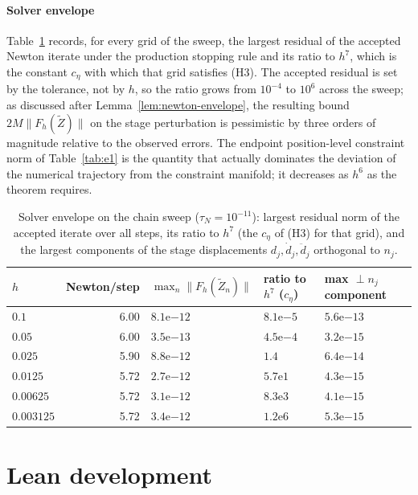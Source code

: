 \paragraph{Solver envelope}
Table~\ref{tab:e7} records, for every grid of the sweep, the largest residual of the accepted Newton
iterate under the production stopping rule and its ratio to $h^7$, which is the constant $c_\eta$
with which that grid satisfies (H3). The accepted residual is set by the tolerance, not by $h$, so
the ratio grows from $10^{-4}$ to $10^{6}$ across the sweep; as discussed after
Lemma~\ref{lem:newton-envelope}, the resulting bound $2M\|F_h(\widetilde Z)\|$ on the stage
perturbation is pessimistic by three orders of magnitude relative to the observed errors. The
endpoint position-level constraint norm of Table~\ref{tab:e1} is the quantity that actually
dominates the deviation of the numerical trajectory from the constraint manifold; it decreases as
$h^6$ as the theorem requires.

\begin{table}[!htb]
\centering
\caption{Solver envelope on the chain sweep ($\tau_N=10^{-11}$): largest residual norm of the
accepted iterate over all steps, its ratio to $h^7$ (the $c_\eta$ of (H3) for that grid), and the
largest components of the stage displacements $d_j,\dot d_j,\ddot d_j$ orthogonal to $n_j$.}
\label{tab:e7}
\footnotesize
\begin{tabular}{@{}lrlll@{}}
\toprule
$h$ & Newton/step & $\max_n\|F_h(\widetilde Z_n)\|$ & ratio to $h^7$ ($c_\eta$) & max $\perp n_j$ component \\
\midrule
$0.1$      & 6.00 & $8.1\mathrm{e}{-12}$ & $8.1\mathrm{e}{-5}$ & $5.6\mathrm{e}{-13}$ \\
$0.05$     & 6.00 & $3.5\mathrm{e}{-13}$ & $4.5\mathrm{e}{-4}$ & $3.2\mathrm{e}{-15}$ \\
$0.025$    & 5.90 & $8.8\mathrm{e}{-12}$ & $1.4$               & $6.4\mathrm{e}{-14}$ \\
$0.0125$   & 5.72 & $2.7\mathrm{e}{-12}$ & $5.7\mathrm{e}{1}$  & $4.3\mathrm{e}{-15}$ \\
$0.00625$  & 5.72 & $3.1\mathrm{e}{-12}$ & $8.3\mathrm{e}{3}$  & $4.1\mathrm{e}{-15}$ \\
$0.003125$ & 5.72 & $3.4\mathrm{e}{-12}$ & $1.2\mathrm{e}{6}$  & $5.3\mathrm{e}{-15}$ \\
\bottomrule
\end{tabular}
\end{table}

\section{Lean development}
\label{app:lean}

